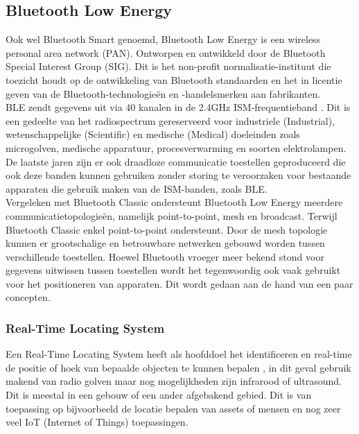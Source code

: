 \subsection{Bluetooth Low Energy}
Ook wel Bluetooth Smart genoemd, Bluetooth Low Energy is een wireless personal area network (PAN). Ontworpen en ontwikkeld door de Bluetooth Special Interest Group (SIG). Dit is het non-profit normalisatie-instituut die toezicht houdt op de ontwikkeling van Bluetooth standaarden en het in licentie geven van de Bluetooth-technologieën en -handelsmerken aan fabrikanten. \\

BLE zendt gegevens uit via 40 kanalen in de 2.4GHz ISM-frequentieband \autocite{Kumbhar_2017}. Dit is een gedeelte van het radiospectrum gereserveerd voor industriele (Industrial), wetenschappelijke (Scientific) en medische (Medical) doeleinden zoals microgolven, medische apparatuur, procesverwarming en soorten elektrolampen. De laatste jaren zijn er ook draadloze communicatie toestellen geproduceerd die ook deze banden kunnen gebruiken zonder storing te veroorzaken voor bestaande apparaten die gebruik maken van de ISM-banden, zoals BLE.\\

Vergeleken met Bluetooth Classic ondersteunt Bluetooth Low Energy meerdere communicatietopologieën, namelijk point-to-point, mesh en broadcast. Terwijl Bluetooth Classic enkel point-to-point ondersteunt. Door de mesh topologie kunnen er grootschalige en betrouwbare netwerken gebouwd worden tussen verschillende toestellen. Hoewel Bluetooth vroeger meer bekend stond voor gegevens uitwissen tussen toestellen wordt het tegenwoordig ook vaak gebruikt voor het positioneren van apparaten. Dit wordt gedaan aan de hand van een paar concepten.

\subsubsection{Real-Time Locating System}

Een Real-Time Locating System heeft als hoofddoel het identificeren en real-time de positie of hoek van bepaalde objecten te kunnen bepalen \autocite{Lehtimaki2018}, in dit geval gebruik makend van radio golven maar nog mogelijkheden zijn infrarood of ultrasound. Dit is meestal in een gebouw of een ander afgebakend gebied. Dit is van toepassing op bijvoorbeeld de locatie bepalen van assets of mensen en nog zeer veel IoT (Internet of Things) toepassingen.

